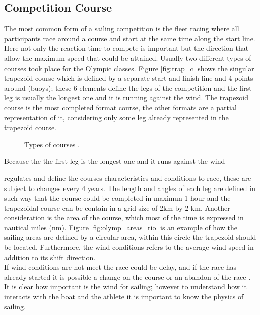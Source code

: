\subsection{Competition Course}\label{tracks}
The most common form of a sailing competition is the fleet racing where all participants race around a course and start at the same time along the start line. Here not only the reaction time to compete is important but the direction that allow the maximum speed that could be attained. Usually two different types of courses took place for the Olympic classes. Figure \ref{fig:trap_c} shows the singular trapezoid course which is defined by a separate start and finish line and 4 points around (buoys); these 6 elements define the legs of the competition and the first leg is usually the longest one and it is running against the wind.
The trapezoid course is the most completed format course, the other formats are a partial representation of it, considering only some leg already represented in the trapezoid course.\\

\begin{figure}[ht]
  \centering
  \hfill
  \caption{Types of courses \cite{instr_rio}.}
\label{fig:typecourses} 
\end{figure}
Because the the first leg is the longest one and it runs against the wind 

\cite{race_pol} regulates and define the courses characteristics and conditions to race, these are subject to changes every 4 years. The length and angles of each leg are defined in such way that the course could be completed in maximun 1 hour and the trapezoidal course can be contain in a grid size of 2km by 2 km.  Another consideration is the area of the course,  which most of the time is expressed in nautical miles (nm). Figure \ref{fig:olymp_areas_rio} is an example of how the sailing areas are defined by a circular area, within this circle the trapezoid should be located. Furthermore, the wind conditions refers to the average wind speed in addition to its shift direction.\\
If wind conditions are not meet the race could be delay, and if the race has already started it is possible a change on the course or an abandon of the race \cite{race_pol}. It is clear how important is the wind for sailing; however to understand how it interacts with the boat and the athlete it is important to know the physics of sailing. \\

